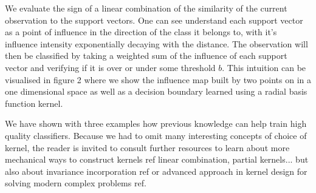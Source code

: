 We evaluate the sign of a linear combination of the similarity of the current observation to the support vectors. One can see understand each support vector as a point of influence in the direction of the class it belongs to, with it's influence intensity exponentially decaying with the distance. The observation will then be classified by taking a weighted sum of the influence of each support vector and verifying if it is over or under some threshold $b$. This intuition can be visualised in figure 2 where we show the influence map built by two points on in a one dimensional space as well as a decision boundary learned using a radial basis function kernel.

We have shown with three examples how previous knowledge can help train high quality classifiers. Because we had to omit many interesting concepts of choice of kernel, the reader is invited to consult further resources to learn about more mechanical ways to construct kernels \textcolor[rgb]{1,0,0}{ref linear combination, partial kernels...} but also about invariance incorporation \textcolor[rgb]{1,0,0}{ref} or advanced approach in kernel design for solving modern complex problems \textcolor[rgb]{1,0,0}{ref}.

